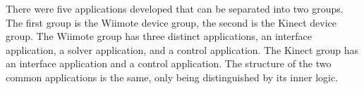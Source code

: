 
	There were five applications developed that can be separated into two groups. The first group is the \ac{Wiimote} device group, the second is the Kinect device group. The Wiimote group has three distinct applications, an interface application, a solver application, and a control application. The Kinect group has an interface application and a control application. The structure of the two common applications is the same, only being distinguished by its inner logic.
	
		\begin{figure}[htb]
	\centering

\end{figure}
